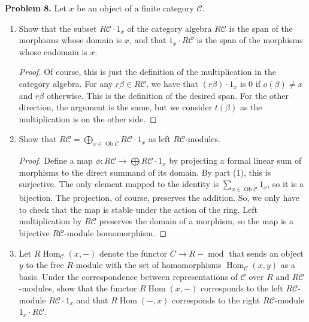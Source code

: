 \documentclass[reqno]{amsart}
\DeclareMathOperator{\Ob}{Ob}
\DeclareMathOperator{\mmod}{mod}
\DeclareMathOperator{\Hom}{Hom}
\theoremstyle{definition}
\theoremstyle{remark}
\newcommand{\prob}[1] {
  \textbf{Problem #1.}
}
\begin{document}
\prob{8} Let $x$ be an object of a finite category $\mathcal{C}$.

\begin{enumerate}
  \item Show that the subset $R \mathcal{C} \cdot 1_x$ of the category algebra
    $R \mathcal{C}$ is the span of the morphisms whose domain is $x$, and that
    $1_x \cdot R\mathcal{C}$ is the span of the morphisms whose codomain is $x$.

    \begin{proof}
      Of course, this is just the definition of the multiplication in the
      category algebra. For any $r \beta \in R \mathcal{C}$, we have that $(r
      \beta) \cdot 1_x$ is $0$ if $o(\beta) \neq x$ and $r \beta$ otherwise.
      This is the definition of the desired span. For the other direction, the
      argument is the same, but we consider $t(\beta)$ as the multiplication is
      on the other side.
    \end{proof}

  \item Show that $R \mathcal{C} = \bigoplus_{x \in \Ob{\mathcal{C}}} R
    \mathcal{C} \cdot 1_x$ as left $R\mathcal{C}$-modules.

    \begin{proof}
      Define a map $\phi : R\mathcal{C} \to \bigoplus R \mathcal{C} \cdot 1_x$
      by projecting a formal linear sum of morphisms to the direct summand of
      its domain. By part ($1$), this is surjective. The only element mapped to
      the identity is $\sum_{x\in\Ob{\mathcal{C}}} 1_x$, so it is a bijection.
      The projection, of course, preserves the addition. So, we only have to
      check that the map is stable under the action of the ring. Left
      multiplication by $R \mathcal{C}$ preserves the domain of a morphism, so
      the map is a bijective $R\mathcal{C}$-module homomorphism.
    \end{proof}

  \item Let $R \Hom_\mathcal{C}(x, -)$ denote the functor $C \to R-\mmod$ that
    sends an object $y$ to the free $R$-module with the set of homomorphisms
    $\Hom_\mathcal{C}(x, y)$ as a basis. Under the correspondence between
    representations of $\mathcal{C}$ over $R$ and $R\mathcal{C}$-modules, show
    that the functor $R \Hom(x, -)$ corresponds to the left
    $R\mathcal{C}$-module $R\mathcal{C}\cdot 1_x$ and that $R \Hom(-, x)$
    corresponds to the right $R\mathcal{C}$-module $1_x \cdot R \mathcal{C}$.


\end{enumerate}
\end{document}
